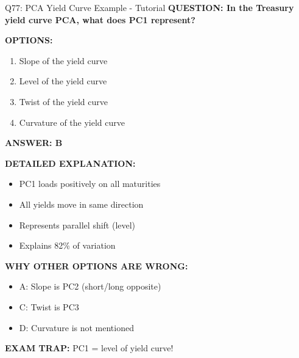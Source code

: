 \documentclass[8pt]{beamer}
\begin{document}
	\begin{frame}{Q77: PCA Yield Curve Example - Tutorial}
		\fontsize{6.5}{7.5}\selectfont
		\textbf{QUESTION: In the Treasury yield curve PCA, what does PC1 represent?}
		
		\vspace{0.1cm}
		\textbf{OPTIONS:}
		\begin{enumerate}
			\item Slope of the yield curve
			\item Level of the yield curve
			\item Twist of the yield curve
			\item Curvature of the yield curve
		\end{enumerate}
		
		\vspace{0.1cm}
		\textcolor{myblue}{\textbf{ANSWER: B}}
		
		\vspace{0.1cm}
		\textbf{DETAILED EXPLANATION:}
		\begin{itemize}
			\item PC1 loads positively on all maturities
			\item All yields move in same direction
			\item Represents parallel shift (level)
			\item Explains 82\% of variation
		\end{itemize}
		
		\vspace{0.1cm}
		\textcolor{myred}{\textbf{WHY OTHER OPTIONS ARE WRONG:}}
		\begin{itemize}
			\item \textcolor{myred}{A:} Slope is PC2 (short/long opposite)
			\item \textcolor{myred}{C:} Twist is PC3
			\item \textcolor{myred}{D:} Curvature is not mentioned
		\end{itemize}
		
		\textcolor{myred}{\textbf{EXAM TRAP:}} PC1 = \textcolor{myblue}{level of yield curve}!
	\end{frame}
	
\end{document}
